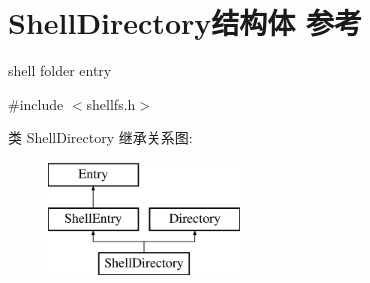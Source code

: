 \hypertarget{struct_shell_directory}{}\section{Shell\+Directory结构体 参考}
\label{struct_shell_directory}


shell folder entry  




{\ttfamily \#include $<$shellfs.\+h$>$}

类 Shell\+Directory 继承关系图\+:\begin{figure}[H]
\begin{center}
\leavevmode
\includegraphics[height=3.000000cm]{struct_shell_directory}
\end{center}
\end{figure}
